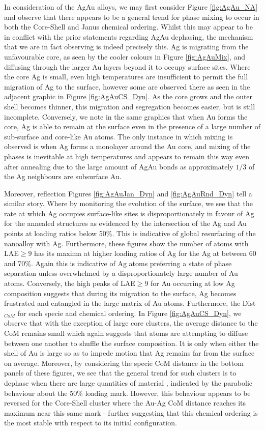 In consideration of the AgAu alloys, we may first consider Figure \ref{fig:AgAu_NA} and observe that there appears to be a general trend for phase mixing to occur in both the Core-Shell and Janus chemical ordering. Whilst this may appear to be in conflict with the prior statements regarding AgAu dephasing, the mechanism that we are in fact observing is indeed precisely this. Ag is migrating from the unfavourable core, as seen by the cooler colours in Figure \ref{fig:AgAuMix}, and diffusing through the larger Au layers beyond it to occupy surface sites. Where the core Ag is small, even high temperatures are insufficient to permit the full migration of Ag to the surface, however some are observed there as seen in the adjacent graphic in Figure \ref{fig:AgAuCS_Dyn}. As the core grows and the outer shell becomes thinner, this migration and segregation becomes easier, but is still incomplete. Conversely, we note in the same graphics that when Au forms the core, Ag is able to remain at the surface even in the presence of a large number of sub-surface and core-like Au atoms. The only instance in which mixing is observed is when Ag forms a monolayer around the Au core, and mixing of the phases is inevitable at high temperatures and appears to remain this way even after annealing due to the large amount of AgAu bonds as approximately $1/3$ of the Ag neighbours are subsurface Au.

Moreover, reflection Figures \ref{fig:AgAuJan_Dyn} and \ref{fig:AgAuRnd_Dyn} tell a similar story. Where by monitoring the evolution of the surface, we see that the rate at which Ag occupies surface-like sites is disproportionately in favour of Ag for the annealed structures as evidenced by the intersection of the Ag and Au points at loading ratios below 50\%. This is indicative of global resurfacing of the nanoalloy with Ag. Furthermore, these figures show the number of atoms with LAE$\geq9$ has its maxima at higher loading ratios of Ag for the Ag at between 60 and 70\%. Again this is indicative of Ag atoms preferring a state of phase separation unless overwhelmed by a disproportionately large number of Au atoms. Conversely, the high peaks of LAE$\geq9$ for Au  occurring at low Ag composition suggests that during its migration to the surface, Ag becomes frustrated and entangled in the large matrix of Au atoms. Furthermore, the Dist$_{CoM}$ for each specie and chemical ordering. In Figure \ref{fig:AgAuCS_Dyn}, we observe that with the exception of large core clusters, the average distance to the CoM remains small which again suggests that atoms are attempting to diffuse between one another to shuffle the surface composition. It is only when either the shell of Au is large so as to impede motion that Ag remains far from the surface on average. Moreover, by considering the specie CoM distance in the bottom panels of these figures, we see that the general trend for such clusters is to dephase when there are large quantities of material , indicated by the parabolic behaviour about the 50\% loading mark. However, this behaviour appears to be reversed for the Core-Shell cluster where the Au-Ag CoM distance reaches its maximum near this same mark - further suggesting that this chemical ordering is the most stable with respect to its initial configuration.  

